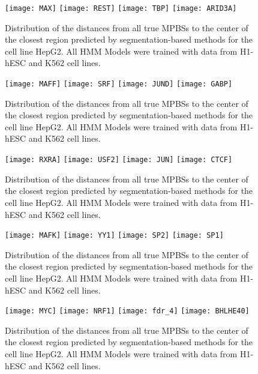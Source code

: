 \documentclass[11pt,a4]{article}
\begin{document}
\begin{figure}[h]
\centering
    \texttt{[image: MAX]}
    \texttt{[image: REST]}
    \texttt{[image: TBP]}
    \texttt{[image: ARID3A]}
\caption{Distribution of the distances from all true MPBSs to the center of the closest region predicted by segmentation-based methods for the cell line HepG2. All HMM Models were trained with data from H1-hESC and K562 cell lines.}
\label{fig:boxplot.HepG2.fdr_4.1}
\end{figure}

\begin{figure}[h]
\centering
    \texttt{[image: MAFF]}
    \texttt{[image: SRF]}
    \texttt{[image: JUND]}
    \texttt{[image: GABP]}
\caption{Distribution of the distances from all true MPBSs to the center of the closest region predicted by segmentation-based methods for the cell line HepG2. All HMM Models were trained with data from H1-hESC and K562 cell lines.}
\label{fig:boxplot.HepG2.fdr_4.2}
\end{figure}

\begin{figure}[h]
\centering
    \texttt{[image: RXRA]}
    \texttt{[image: USF2]}
    \texttt{[image: JUN]}
    \texttt{[image: CTCF]}
\caption{Distribution of the distances from all true MPBSs to the center of the closest region predicted by segmentation-based methods for the cell line HepG2. All HMM Models were trained with data from H1-hESC and K562 cell lines.}
\label{fig:boxplot.HepG2.fdr_4.3}
\end{figure}

\begin{figure}[h]
\centering
    \texttt{[image: MAFK]}
    \texttt{[image: YY1]}
    \texttt{[image: SP2]}
    \texttt{[image: SP1]}
\caption{Distribution of the distances from all true MPBSs to the center of the closest region predicted by segmentation-based methods for the cell line HepG2. All HMM Models were trained with data from H1-hESC and K562 cell lines.}
\label{fig:boxplot.HepG2.fdr_4.4}
\end{figure}

\begin{figure}[h]
\centering
    \texttt{[image: MYC]}
    \texttt{[image: NRF1]}
    \texttt{[image: fdr\_4]}
    \texttt{[image: BHLHE40]}
\caption{Distribution of the distances from all true MPBSs to the center of the closest region predicted by segmentation-based methods for the cell line HepG2. All HMM Models were trained with data from H1-hESC and K562 cell lines.}
\label{fig:boxplot.HepG2.fdr_4.5}
\end{figure}
\end{document}
